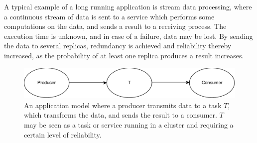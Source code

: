 \documentclass{cslthse-msc}
\begin{document}
A typical example of a long running application is stream data processing, where a continuous stream of data is sent to a service which performs some computations on the data, and sends a result to a receiving process. The execution time is unknown, and in case of a failure, data may be lost. By sending the data to several replicas, redundancy is achieved and reliability thereby increased, as the probability of at least one replica produces a result increases.

\begin{figure}[!hbt]
\centering
\includegraphics[scale=0.5]{images/app_model.pdf} 
\caption{An application model where a producer transmits data to a task $T$, which transforms the data, and sends the result to a consumer. $T$ may be seen as a task or service running in a cluster and requiring a certain level of reliability.}\label{fig:app_model}
\end{figure}

\iffalse
\end{document}
